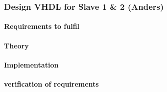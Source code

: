 




\subsubsection{Design VHDL for Slave 1 \& 2 (Anders)}
\paragraph{Requirements to fulfil}


\paragraph{Theory}


\paragraph{Implementation}


\paragraph{verification of requirements}


